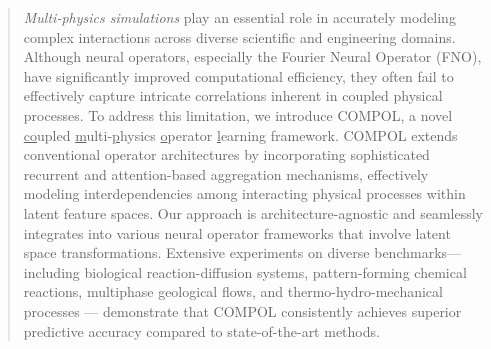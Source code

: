 
\begin{abstract}
	\textit{Multi-physics simulations} play an essential role in accurately modeling complex interactions across diverse scientific and engineering domains. Although neural operators, especially the Fourier Neural Operator (FNO), have significantly improved computational efficiency, they often fail to effectively capture intricate correlations inherent in coupled physical processes. To address this limitation, we introduce COMPOL, a novel \underline{co}upled \underline{m}ulti-\underline{p}hysics \underline{o}perator \underline{l}earning framework. COMPOL extends conventional operator architectures by incorporating sophisticated recurrent and attention-based aggregation mechanisms, effectively modeling interdependencies among interacting physical processes within latent feature spaces. Our approach is architecture-agnostic and seamlessly integrates into various neural operator frameworks that involve latent space transformations. Extensive experiments on diverse benchmarks—including biological reaction-diffusion systems, pattern-forming chemical reactions, multiphase geological flows, and thermo-hydro-mechanical processes — demonstrate that COMPOL consistently achieves superior predictive accuracy compared to state-of-the-art methods.
\end{abstract}


